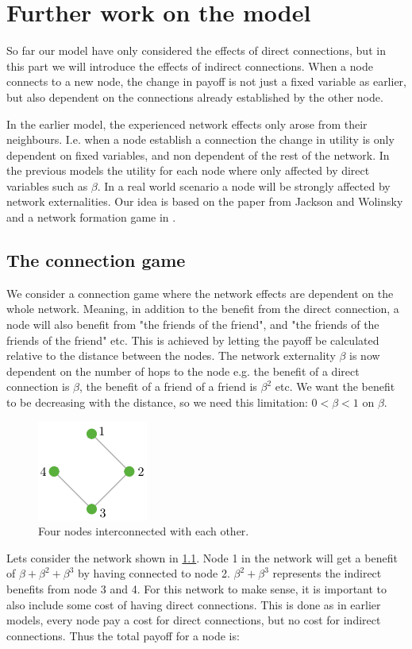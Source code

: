 \chapter{Further work on the model}
\label{secondPhaseOfModelingCyberInsurance} 

So far our model have only considered the effects of direct connections, but in this part we will introduce the effects of indirect connections. When a node connects to a new node, the change in payoff is not just a fixed variable as earlier, but also dependent on the connections already established by the other node.

In the earlier model, the experienced network effects only arose from their neighbours. I.e. when a node establish a connection the change in utility is only dependent on fixed variables, and non dependent of the rest of the network.
In the previous models the utility for each node where only affected by direct variables such as $\beta$. In a real world scenario a node will be strongly affected by network externalities. Our idea is based on the paper from Jackson and Wolinsky \cite{jackson1996strategic} and a network formation game in \cite{jackson2005survey}. 

\section{The connection game}
We consider a connection game where the network effects are dependent on the whole network.  Meaning, in addition to the benefit from the direct connection, a node will also benefit from "the friends of the friend", and "the friends of the friends of the friend" etc. This is achieved by letting the payoff be calculated relative to the distance between the nodes. The network externality $\beta$ is now dependent on the number of hops to the node e.g. the benefit of a direct connection is $\beta$, the benefit of a friend of a friend is $\beta^2$ etc. We want the benefit to be decreasing with the distance, so we need this limitation: $0<\beta<1$ on $\beta$. 

\begin{figure}[h]
\centering
  \includegraphics[width=0.2\linewidth]{../Figures/connectionGame.png}
  \caption{\label{fig:connectionGame} Four nodes interconnected with each other.}
\end{figure}
Lets consider the network shown in \ref{fig:connectionGame}. Node 1 in the network will get a benefit of $\beta+\beta^{2}+\beta^{3}$ by having connected to node 2. $\beta^{2}+\beta^{3}$ represents the indirect benefits from node 3 and 4. For this network to make sense, it is important to also include some cost of having direct connections. This is done as in earlier models, every node pay a cost for direct connections, but no cost for indirect connections. Thus the total payoff for a node is:

